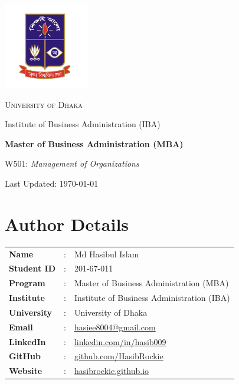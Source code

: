 \documentclass[12pt,a4paper]{book}
\begin{document}
\begin{titlepage}
    \centering
    \vspace*{3.5cm}
    \includegraphics[width=0.28\textwidth]{logo.png}\par\vspace{1.5cm}
    {\scshape\LARGE University of Dhaka\par}
    \vspace{0.5cm}
    {\Large Institute of Business Administration (IBA)\par}
    \vspace{1.5cm}
    {\Huge\bfseries Master of Business Administration (MBA)\par}
    \vspace{1cm}
    {\Large W501: \textit{Management of Organizations}\par}
    \vfill
    {\large Last Updated: \today\par}
\end{titlepage}

\section*{Author Details}
{}

\begin{center}
    \vspace{1em}
    \begin{tabular}{lll}
        \textbf{Name} & : & Md Hasibul Islam \\
        \textbf{Student ID} & : & 201-67-011 \\
        \textbf{Program} & : & Master of Business Administration (MBA) \\
        \textbf{Institute} & : & Institute of Business Administration (IBA) \\
        \textbf{University} & : & University of Dhaka \\
        \textbf{Email} & : & \href{mailto:hasiee8004@gmail.com}{hasiee8004@gmail.com} \\
        \textbf{LinkedIn} & : & \href{https://www.linkedin.com/in/hasib009}{linkedin.com/in/hasib009} \\
        \textbf{GitHub} & : & \href{https://github.com/HasibRockie}{github.com/HasibRockie} \\
        \textbf{Website} & : & \href{https://hasibrockie.github.io}{hasibrockie.github.io} \\
    \end{tabular}
    \vspace{1em}
\end{center}
\end{document}

